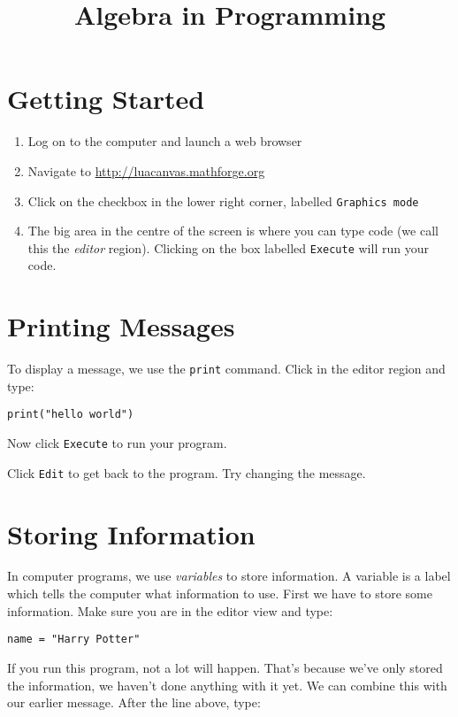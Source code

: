 \documentclass[
  xhtml,%
  use filename%
]{internet}
\title{Algebra in Programming}
\begin{document}
\maketitle

\section*{Getting Started}

\begin{enumerate}
\item Log on to the computer and launch a web browser
\item Navigate to \href{http://luacanvas.mathforge.org}{http://luacanvas.mathforge.org} 
\item Click on the checkbox in the lower right corner, labelled \verb+Graphics mode+
\item The big area in the centre of the screen is where you can type code (we call this the \emph{editor} region).
Clicking on the box labelled \verb+Execute+ will run your code.
\end{enumerate}

\section*{Printing Messages}

To display a message, we use the \verb+print+ command.
Click in the editor region and type:

\begin{verbatim}
print("hello world")
\end{verbatim}

Now click \verb+Execute+ to run your program.

Click \verb+Edit+ to get back to the program.
Try changing the message.

\section*{Storing Information}

In computer programs, we use \emph{variables} to store information.
A variable is a label which tells the computer what information to use.
First we have to store some information.
Make sure you are in the editor view and type:

\begin{verbatim}
name = "Harry Potter"
\end{verbatim}

If you run this program, not a lot will happen.
That's because we've only stored the information, we haven't done anything with it yet.
We can combine this with our earlier message.
After the line above, type:
\end{document}
